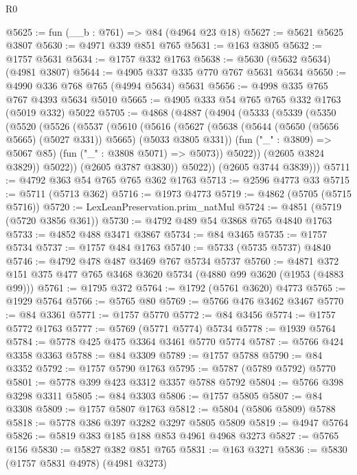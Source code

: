 \begin{lexlean}{R0}
\begin{coremodule}
{{{{{@5625 := fun (__b : @761) => @84 (@4964 @23 @18)
@5627 := @5621 @5625 @3807
@5630 := @4971 @339 @851 @765
@5631 := @163 @3805
@5632 := @1757 @5631
@5634 := @1757 @332 @1763
@5638 := @5630 (@5632 @5634) (@4981 @3807)
@5644 := @4905 @337 @335 @770 @767 @5631 @5634
@5650 := @4990 @336 @768 @765 (@4994 @5634) @5631
@5656 := @4998 @335 @765 @767 @4393 @5634 @5010
@5665 := @4905 @333 @54 @765 @765 @332 @1763 (@5019 @332) @5022
@5705 := @4868
    (@4887
      (@4904
        (@5333
          (@5339
            (@5350
              (@5520
                (@5526
                  (@5537
                    (@5610
                      (@5616
                        (@5627
                          (@5638
                            (@5644 (@5650 (@5656 @5665) (@5027 @331)) @5665)
                            (@5033 @3805 @331))
                          (fun ("_" : @3809) => @5067 @85)
                          (fun ("_" : @3808 @5071) => @5073))
                        @5022))
                    (@2605 @3824 @3829))
                  @5022))
              (@2605 @3787 @3830))
            @5022))
        (@2605 @3744 @3839)))
@5711 := @4792 @363 @54 @765 @765 @362 @1763
@5713 := @2596 @4773 @33
@5715 := @5711 (@5713 @362)
@5716 := @1973 @4773
@5719 := @4862 (@5705 (@5715 @5716))
@5720 := LexLeanPreservation.prim_natMul
@5724 := @4851 (@5719 (@5720 @3856 @361))
@5730 := @4792 @489 @54 @3868 @765 @4840 @1763
@5733 := @4852 @488 @3471 @3867
@5734 := @84 @3465
@5735 := @1757 @5734
@5737 := @1757 @484 @1763
@5740 := @5733 (@5735 @5737) @4840
@5746 := @4792 @478 @487 @3469 @767 @5734 @5737
@5760 := @4871 @372 @151 @375 @477 @765 @3468 @3620 @5734 (@4880 @99 @3620 (@1953 (@4883 @99)))
@5761 := @1795 @372
@5764 := @1792 (@5761 @3620) @4773
@5765 := @1929 @5764
@5766 := @5765 @80
@5769 := @5766 @476 @3462 @3467
@5770 := @84 @3361
@5771 := @1757 @5770
@5772 := @84 @3456
@5774 := @1757 @5772 @1763
@5777 := @5769 (@5771 @5774) @5734
@5778 := @1939 @5764
@5784 := @5778 @425 @475 @3364 @3461 @5770 @5774
@5787 := @5766 @424 @3358 @3363
@5788 := @84 @3309
@5789 := @1757 @5788
@5790 := @84 @3352
@5792 := @1757 @5790 @1763
@5795 := @5787 (@5789 @5792) @5770
@5801 := @5778 @399 @423 @3312 @3357 @5788 @5792
@5804 := @5766 @398 @3298 @3311
@5805 := @84 @3303
@5806 := @1757 @5805
@5807 := @84 @3308
@5809 := @1757 @5807 @1763
@5812 := @5804 (@5806 @5809) @5788
@5818 := @5778 @386 @397 @3282 @3297 @5805 @5809
@5819 := @4947 @5764
@5826 := @5819 @383 @185 @188 @853 @4961 @4968 @3273
@5827 := @5765 @156
@5830 := @5827 @382 @851 @765
@5831 := @163 @3271
@5836 := @5830 (@1757 @5831 @4978) (@4981 @3273)
}}}}}
\end{coremodule}
\end{lexlean}
